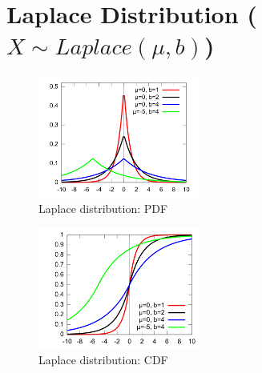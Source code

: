 \chapter{Laplace Distribution ($X \sim Laplace(\mu,b)$) \cite{dnn-deep-learning-ian,wiki/Laplace_distribution}} \label{Laplace Distribution}

\begin{table}[H]
    \begin{minipage}{0.49\linewidth}
        \begin{figure}[H]
            \centering
            \includegraphics[width=\linewidth, height=4cm, keepaspectratio]{Pictures/distributions/Laplace_pdf_mod.png}
            \caption{Laplace distribution: PDF}
        \end{figure}
    \end{minipage}
    \hfill
    \begin{minipage}{0.49\linewidth}
        \begin{figure}[H]
            \centering
            \includegraphics[width=\linewidth, height=4cm, keepaspectratio]{Pictures/distributions/Laplace_cdf_mod.png}
            \caption{Laplace distribution: CDF}
        \end{figure}
    \end{minipage}
\end{table}


